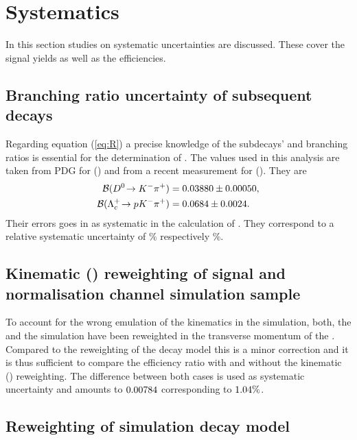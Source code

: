 \chapter{Systematics}
\label{sec:Systematics}

In this section studies on systematic uncertainties are discussed.
These cover the signal yields as well as the efficiencies.

\section{Branching ratio uncertainty of subsequent decays}
Regarding equation (\ref{eq:R}) a precise knowledge of the subdecays' \DToKpi and \LcTopKpi branching ratios is essential for the determination of \R.
The values used in this analysis are taken from PDG \cite{PDG} for \BR(\DToKpi) and from a recent \belle measurement \cite{Belle_BR_LcTopKpi} for \BR(\LcTopKpi).
They are
\begin{align*}
    {\ensuremath{\cal B}}({{D}^0}\!\rightarrow {\ensuremath{{K}^-}}{\ensuremath{{\pi}^+}}) &= 0.03880 \pm 0.00050, \\ 
    {\cal B}({{\Lambda}^+_{c}}\!\rightarrow {\ensuremath{p}}{\ensuremath{{K}^-}}{\ensuremath{{\pi}^+}}) &= 0.0684 \pm 0.0024.
\end{align*}
Their errors goes in as systematic in the calculation of \R.
They correspond to a relative systematic uncertainty of \SystBRDToKpipercent\% respectively \SystBRLcTopKpipercent\%.

\section{Kinematic \pt(\Lb) reweighting of signal and normalisation channel simulation sample}
To account for the wrong emulation of the \Lb kinematics in the simulation, both, the \LbToDpmunuX and the \LbToLcmunu simulation have been reweighted in the transverse momentum of the \Lb.
Compared to the reweighting of the \LbToDpmunuX decay model this is a minor correction and it is thus sufficient to compare the efficiency ratio \effRatio with and without the kinematic \pt(\Lb) reweighting.
The difference between both cases is used as systematic uncertainty and amounts to $0.00784$ corresponding to $1.04\%$.


\section{Reweighting of \LbToDpmunuX simulation decay model}
